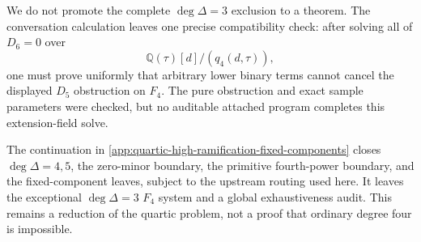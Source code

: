 We do not promote the complete \(\deg\Delta=3\) exclusion to a theorem.
The conversation calculation leaves one precise compatibility check:
after solving all of \(D_6=0\) over
\[
\mathbb Q(\tau)[d]/(q_4(d,\tau)),
\]
one must prove uniformly that arbitrary lower binary terms cannot cancel
the displayed \(D_5\) obstruction on \(F_4\).  The pure obstruction and
exact sample parameters were checked, but no auditable attached program
completes this extension-field solve.

The continuation in
\cref{app:quartic-high-ramification-fixed-components} closes
\(\deg\Delta=4,5\), the zero-minor boundary, the primitive fourth-power
boundary, and the fixed-component leaves, subject to the upstream routing
used here.  It leaves the exceptional \(\deg\Delta=3\) \(F_4\) system and
a global exhaustiveness audit.  This remains a reduction of the quartic
problem, not a proof that ordinary degree four is impossible.

